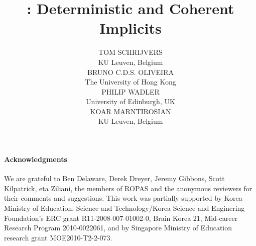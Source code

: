 \documentclass{jfp1}
\title[Cochis: Deterministic and Coherent Implicits]{\name: Deterministic and Coherent Implicits}
\author[T. Schrijvers, B. Oliveira and P. Wadler]
       {TOM SCHRIJVERS \\
        KU Leuven, Belgium \\
        BRUNO C.D.S. OLIVEIRA \\
        The University of Hong Kong \\
        PHILIP WADLER \\ 
        University of Edinburgh, UK \\
        KOAR MARNTIROSIAN \\
        KU Leuven, Belgium
}
\begin{document}
\maketitle

\begin{abstract}

\end{abstract}












%






\paragraph{Acknowledgments}
We are grateful to Ben Delaware, Derek Dreyer, Jeremy Gibbons, Scott
Kilpatrick, eta Ziliani, the members of ROPAS and the
anonymous reviewers for their comments and suggestions.  This work was
partially supported by Korea Ministry of Education, Science and
Technology/Korea Science and Enginering Foundation's ERC grant
R11-2008-007-01002-0, Brain Korea 21, Mid-career Research Program 2010-0022061, and
by Singapore Ministry of Education research grant MOE2010-T2-2-073.

\newpage


\newpage
\appendix




\end{document}
